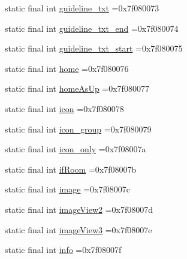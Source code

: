 \begin{DoxyCompactItemize}
\item 
static final int \mbox{\hyperlink{classbr_1_1unb_1_1cic_1_1mp_1_1marketmaster_1_1R_1_1id_a707fd0b6ef2391041c68a3c7deff7303}{guideline\+\_\+txt}} =0x7f080073
\item 
static final int \mbox{\hyperlink{classbr_1_1unb_1_1cic_1_1mp_1_1marketmaster_1_1R_1_1id_a5758916134864366060042b8d9055997}{guideline\+\_\+txt\+\_\+end}} =0x7f080074
\item 
static final int \mbox{\hyperlink{classbr_1_1unb_1_1cic_1_1mp_1_1marketmaster_1_1R_1_1id_ace0ea09913c47cfeddd7811f94a48e37}{guideline\+\_\+txt\+\_\+start}} =0x7f080075
\item 
static final int \mbox{\hyperlink{classbr_1_1unb_1_1cic_1_1mp_1_1marketmaster_1_1R_1_1id_a7654b7215bb9fbf08e1389fe66b45052}{home}} =0x7f080076
\item 
static final int \mbox{\hyperlink{classbr_1_1unb_1_1cic_1_1mp_1_1marketmaster_1_1R_1_1id_ae230f54ae0c79744734bc2c9c919549d}{home\+As\+Up}} =0x7f080077
\item 
static final int \mbox{\hyperlink{classbr_1_1unb_1_1cic_1_1mp_1_1marketmaster_1_1R_1_1id_a002d3fc368306991622ac8c65c70ba41}{icon}} =0x7f080078
\item 
static final int \mbox{\hyperlink{classbr_1_1unb_1_1cic_1_1mp_1_1marketmaster_1_1R_1_1id_ad8aa0d6a87aed3de41e057d5461d7e30}{icon\+\_\+group}} =0x7f080079
\item 
static final int \mbox{\hyperlink{classbr_1_1unb_1_1cic_1_1mp_1_1marketmaster_1_1R_1_1id_aee8a0e5c17d8bad267681538a6e097ef}{icon\+\_\+only}} =0x7f08007a
\item 
static final int \mbox{\hyperlink{classbr_1_1unb_1_1cic_1_1mp_1_1marketmaster_1_1R_1_1id_a02a362f2304cd0ee9a25bd552d0c7385}{if\+Room}} =0x7f08007b
\item 
static final int \mbox{\hyperlink{classbr_1_1unb_1_1cic_1_1mp_1_1marketmaster_1_1R_1_1id_a1e4b208656703039739b836ee4a1941e}{image}} =0x7f08007c
\item 
static final int \mbox{\hyperlink{classbr_1_1unb_1_1cic_1_1mp_1_1marketmaster_1_1R_1_1id_a2958af32d9fe101330761ab4ec502025}{image\+View2}} =0x7f08007d
\item 
static final int \mbox{\hyperlink{classbr_1_1unb_1_1cic_1_1mp_1_1marketmaster_1_1R_1_1id_a51453cc82d3713fad3c38cd04eca989f}{image\+View3}} =0x7f08007e
\item 
static final int \mbox{\hyperlink{classbr_1_1unb_1_1cic_1_1mp_1_1marketmaster_1_1R_1_1id_a8b2b0ee4a69b2bcdf94a7d5b517198de}{info}} =0x7f08007f
\item 

\end{DoxyCompactItemize}
